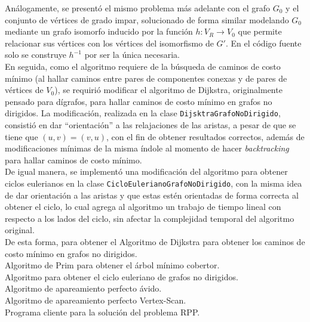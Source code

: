 \documentclass[11pt]{article}
\begin{document}
Análogamente, se presentó el mismo problema más adelante
con el grafo $G_0$ y el conjunto de vértices de grado impar,
solucionado de forma similar modelando $G_0$ mediante un grafo
isomorfo inducido por la función $h: V_R \rightarrow V_0 $ que
permite relacionar sus vértices con los vértices del isomorfismo
de $G'$. En el código fuente solo se construye $ h^{-1} $ por ser
la única necesaria. \\

En seguida, como el algoritmo requiere de la búsqueda de 
caminos de costo mínimo (al hallar caminos entre pares de componentes
conexas y de pares de vértices de $V_0$), se requirió modificar
el algoritmo de Dijkstra, originalmente pensado para dígrafos,
para hallar caminos de costo mínimo en grafos no dirigidos. 
La modificación, realizada en la clase \texttt{DijsktraGrafoNoDirigido},
consistió en dar ``orientación'' a las relajaciones de las aristas,
a pesar de que se tiene que $(u, v) = (v, u)$, con el fin de obtener
resultados correctos, además de modificaciones mínimas de la
misma índole al momento de hacer \emph{backtracking} para hallar
caminos de costo mínimo. \\

De igual manera, se implementó una modificación del algoritmo para
obtener ciclos eulerianos en la clase \texttt{CicloEulerianoGrafoNoDirigido},
con la misma idea de dar orientación a las aristas y que estas estén
orientadas de forma correcta al obtener el ciclo, lo cual agrega al
algoritmo un trabajo de tiempo lineal con respecto a los lados del
ciclo, sin afectar la complejidad temporal del algoritmo original. \\

De esta forma, para obtener el 
Algoritmo de Dijkstra para obtener los caminos de costo mínimo en grafos no dirigidos. \\

Algoritmo de Prim para obtener el árbol mínimo cobertor.\\

Algoritmo para obtener el ciclo euleriano de grafos no dirigidos.\\

Algoritmo de apareamiento perfecto ávido.\\

Algoritmo de apareamiento perfecto Vertex-Scan.\\

Programa cliente para la solución del problema RPP.\\
\end{document}
